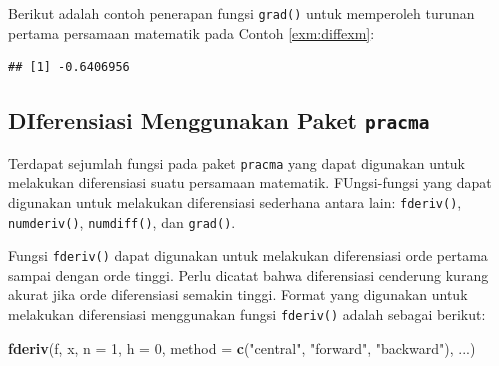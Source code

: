 \documentclass[]{book}
\newenvironment{Shaded}{\begin{snugshade}}{\end{snugshade}}
\newcommand{\ControlFlowTok}[1]{\textcolor[rgb]{0.13,0.29,0.53}{\textbf{#1}}}
\newcommand{\DataTypeTok}[1]{\textcolor[rgb]{0.13,0.29,0.53}{#1}}
\newcommand{\DecValTok}[1]{\textcolor[rgb]{0.00,0.00,0.81}{#1}}
\newcommand{\KeywordTok}[1]{\textcolor[rgb]{0.13,0.29,0.53}{\textbf{#1}}}
\newcommand{\NormalTok}[1]{#1}
\newcommand{\OperatorTok}[1]{\textcolor[rgb]{0.81,0.36,0.00}{\textbf{#1}}}
\newcommand{\StringTok}[1]{\textcolor[rgb]{0.31,0.60,0.02}{#1}}
\theoremstyle{definition}
\theoremstyle{definition}
\theoremstyle{definition}
\theoremstyle{remark}
\begin{document}
Berikut adalah contoh penerapan fungsi \texttt{grad()} untuk memperoleh turunan pertama persamaan matematik pada Contoh \ref{exm:diffexm}:

\begin{Shaded}
\end{Shaded}

\begin{verbatim}
## [1] -0.6406956
\end{verbatim}

\hypertarget{diferensiasi-menggunakan-paket-pracma}{%
\subsection{\texorpdfstring{DIferensiasi Menggunakan Paket \texttt{pracma}}{DIferensiasi Menggunakan Paket pracma}}\label{diferensiasi-menggunakan-paket-pracma}}

Terdapat sejumlah fungsi pada paket \texttt{pracma} yang dapat digunakan untuk melakukan diferensiasi suatu persamaan matematik. FUngsi-fungsi yang dapat digunakan untuk melakukan diferensiasi sederhana antara lain: \texttt{fderiv()}, \texttt{numderiv()}, \texttt{numdiff()}, dan \texttt{grad()}.

Fungsi \texttt{fderiv()} dapat digunakan untuk melakukan diferensiasi orde pertama sampai dengan orde tinggi. Perlu dicatat bahwa diferensiasi cenderung kurang akurat jika orde diferensiasi semakin tinggi. Format yang digunakan untuk melakukan diferensiasi menggunakan fungsi \texttt{fderiv()} adalah sebagai berikut:

\begin{Shaded}
\begin{Highlighting}[]
\KeywordTok{fderiv}\NormalTok{(f, x, }\DataTypeTok{n =} \DecValTok{1}\NormalTok{, }\DataTypeTok{h =} \DecValTok{0}\NormalTok{,}
        \DataTypeTok{method =} \KeywordTok{c}\NormalTok{(}\StringTok{"central"}\NormalTok{, }\StringTok{"forward"}\NormalTok{, }\StringTok{"backward"}\NormalTok{), }
\NormalTok{       ...)}
\end{Highlighting}
\end{Shaded}
\end{document}
